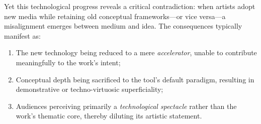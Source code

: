 \documentclass[sigconf,nonacm]{acmart}
\begin{document}
Yet this technological progress reveals a critical contradiction: when artists adopt new media while retaining old conceptual frameworks—or vice versa—a misalignment emerges between medium and idea. The consequences typically manifest as:  
\begin{enumerate}
    \item The new technology being reduced to a mere \emph{accelerator}, unable to contribute meaningfully to the work's intent;
    \item Conceptual depth being sacrificed to the tool's default paradigm, resulting in demonstrative or techno-virtuosic superficiality;
    \item Audiences perceiving primarily a \emph{technological spectacle} rather than the work's thematic core, thereby diluting its artistic statement.
\end{enumerate}
\end{document}
